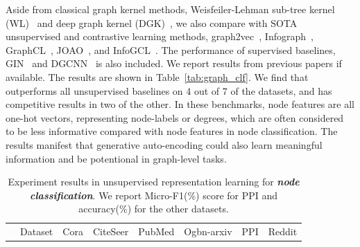 {
Aside from classical graph kernel methods, Weisfeiler-Lehman sub-tree kernel (WL)~\cite{shervashidze2011weisfeiler} and deep graph kernel (DGK)~\cite{yanardag2015deep}, we also compare \model with SOTA unsupervised and contrastive learning methods, graph2vec~\cite{narayanan2017graph2vec}, Infograph~\cite{sun2019infograph}, GraphCL~\cite{you2020graph}, JOAO~\cite{you2021graph}, and InfoGCL~\cite{Xu2021InfoGCLIG}. The performance of supervised baselines, GIN~\cite{xu2019powerful} and DGCNN~\cite{Zhang2018AnED} is also included. We report results from previous papers if available.
The results are shown in Table~\ref{tab:graph_clf}.
We find that \model outperforms all unsupervised baselines on 4 out of 7 of the datasets, and has competitive results in two of the other. In these benchmarks, node features are all one-hot vectors, representing node-labels or degrees, which are often considered to be less informative compared with node features in node classification.  The results manifest that generative auto-encoding could also learn meaningful information and be potentional in graph-level tasks.









\begin{table}[htbp]
    \centering
    \caption{\textmd{Experiment results in unsupervised representation learning for \textbf{\textit{node classification}}. We report Micro-F1(\%) score for PPI and accuracy(\%) for the other datasets. }}
    \begin{threeparttable}
    \renewcommand\tabcolsep{8pt}
    \begin{tabular}{c|c|cccccc}
        \toprule[1.2pt]
            & Dataset &   Cora      & CiteSeer      & PubMed                & Ogbn-arxiv        & PPI               & Reddit        \\


\end{tabular}
\end{threeparttable}
\end{table}}
